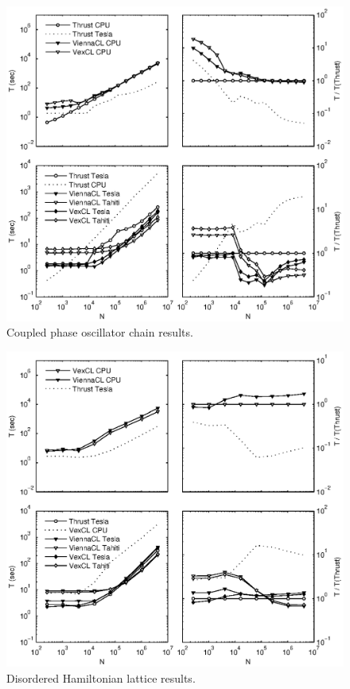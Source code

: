 \documentclass[final]{siamltex}
\begin{document}
\begin{figure}
    \begin{center}
        \includegraphics[width=\textwidth]{data/phase_oscillator_chain/perfmtx}
    \end{center}
    \caption{Coupled phase oscillator chain results.}
    \label{fig:phase:perf}
\end{figure}

\begin{figure}
    \begin{center}
        \includegraphics[width=\textwidth]{data/disordered_ham_lattice/perfmtx}
    \end{center}
    \caption{Disordered Hamiltonian lattice results.}
    \label{fig:lattice:perf}
\end{figure}
\end{document}
